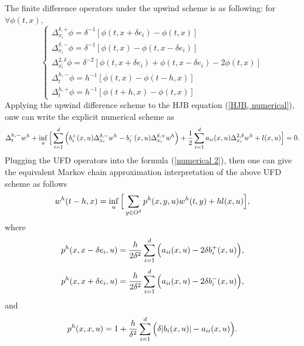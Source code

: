 \documentclass{article}
\begin{document}
The finite difference operators under the upwind scheme is as following: for $\forall \phi(t, x)$,
\begin{equation*}
    \begin{cases}
    \Delta_{x_{i}}^{\delta, +} \phi = \delta^{-1} [\phi(t, x + \delta e_{i}) - \phi(t, x)] \\
    \Delta_{x_{i}}^{\delta, -} \phi = \delta^{-1} [\phi(t, x) - \phi(t, x - \delta e_{i})] \\
    \Delta_{x_{i}}^{2, \delta} \phi = \delta^{-2}[\phi(t, x + \delta e_{i}) + \phi(t, x -  \delta e_{i}) - 2 \phi(t, x)] \\
    \Delta_{t}^{h, -}\phi = h^{-1} [\phi(t, x) - \phi(t-h, x)] \\
    \Delta_{t}^{h, +}\phi = h^{-1} [\phi(t+h, x) - \phi(t, x)]
    \end{cases}
\end{equation*}
Applying the upwind difference scheme to the HJB equation (\ref{HJB, numerical}), onw can write the explicit numerical scheme as
\begin{equation} \label{numerical 2}
    \Delta_{t}^{h, -} w^{h} + \inf_{u} \Big{[} \sum_{i = 1}^{d} \Big{(} b_{i}^{+}(x, u) \Delta_{x_{i}}^{\delta, -} w^{h} - b_{i}^{-}(x, u) \Delta_{x_{i}}^{\delta, +} w^{h} \Big{)} + \frac{1}{2} \sum_{i = 1}^{d} a_{ii} (x, u) \Delta_{x_{i}}^{2, \delta} w^{h} + l(x, u) \Big{]} = 0.
\end{equation}
Plugging the UFD operators into the formula (\ref{numerical 2}), then one can give the equivalent Markov chain approximation interpretation of the above UFD scheme as follows
\begin{equation}
    w^{h} (t - h, x) = \inf_{u} \Big{[} \sum_{y \in O^{\delta}} p^{h}(x, y, u) w^{h}(t, y) + h l(x, u) \Big{]},
\end{equation}
where
\begin{equation*}
    p^{h} (x, x - \delta e_{i}, u) = \frac{h}{2 \delta^{2}} \sum_{i = 1}^{d} \Big{(} a_{ii}(x, u) - 2 \delta b_{i}^{+} (x, u) \Big{)},
\end{equation*}
\begin{equation*}
    p^{h} (x, x + \delta e_{i}, u) = \frac{h}{2 \delta^{2}} \sum_{i = 1}^{d} \Big{(} a_{ii}(x, u) - 2 \delta b_{i}^{-} (x, u) \Big{)},
\end{equation*}
and
\begin{equation*}
    p^{h} (x, x, u) = 1 + \frac{h}{\delta^{2}} \sum_{i = 1}^{d} \Big{(} \delta |b_{i}(x, u) | - a_{ii} (x, u) \Big{)}.
\end{equation*}
\end{document}
